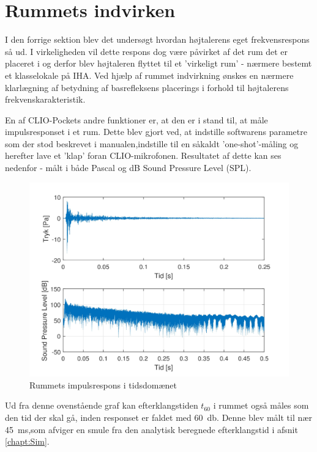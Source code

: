 \newpage
\section{Rummets indvirken}
I den forrige sektion blev det undersøgt hvordan højtalerens eget frekvensrespons så ud. I virkeligheden vil dette respons dog være påvirket af det rum det er placeret i og derfor blev højtaleren flyttet til et 'virkeligt rum' - nærmere bestemt et klasselokale på IHA. Ved hjælp af rummet indvirkning ønskes en nærmere klarlægning af betydning af basrefleksens placerings i forhold til højtalerens frekvenskarakteristik.

En af CLIO-Pockets andre funktioner er, at den er i stand til, at måle impulsresponset i et rum. Dette blev gjort ved, at indstille softwarens parametre som der stod beskrevet i manualen,indstille til en såkaldt 'one-shot'-måling og herefter lave et 'klap' foran CLIO-mikrofonen. Resultatet af dette kan ses nedenfor - målt i både Pascal og dB Sound Pressure Level (SPL).
\begin{figure}[H]
	\centering
	\vspace{-12pt}
	\includegraphics[width=\textwidth]{Billeder/Grafer/ImpulsResponse}
	\caption{Rummets impulsrespons i tidsdomænet}
\end{figure}

Ud fra denne ovenstående graf kan efterklangstiden $t_{60}$ i rummet også måles som den tid der skal gå, inden responset er faldet med \SI{60}{\decibel}. Denne blev målt til nær \SI{45}{\milli\second},som afviger en smule fra den analytisk beregnede efterklangstid i afsnit \ref{chapt:Sim}.

